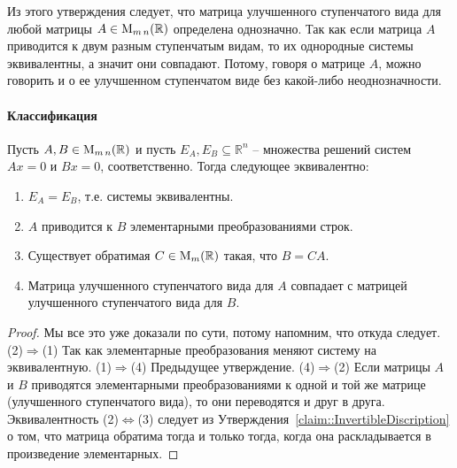 Из этого утверждения следует, что матрица улучшенного ступенчатого вида для любой матрицы $A\in\operatorname{M}_{m\,n}(\mathbb R)$ определена однозначно.
Так как если матрица $A$ приводится к двум разным ступенчатым видам, то их однородные системы эквивалентны, а значит они совпадают.
Потому, говоря о матрице $A$, можно говорить и о ее улучшенном ступенчатом виде без какой-либо неоднозначности.

\paragraph{Классификация}

\begin{claim}
Пусть $A,B\in\operatorname{M}_{m\,n}(\mathbb R)$ и пусть $E_A, E_B\subseteq \mathbb R^n$ -- множества решений систем $Ax = 0$ и $Bx = 0$, соответственно.
Тогда следующее эквивалентно:
\begin{enumerate}
\item $E_A = E_B$, т.е. системы эквивалентны.

\item $A$ приводится к $B$ элементарными преобразованиями строк.

\item Существует обратимая $C\in\operatorname{M}_{m}(\mathbb R)$ такая, что $B = CA$.

\item Матрица улучшенного ступенчатого вида для $A$ совпадает с матрицей улучшенного ступенчатого вида для $B$.
\end{enumerate}
\end{claim}
\begin{proof}
Мы все это уже доказали по сути, потому напомним, что откуда следует.
(2)$\Rightarrow$(1) Так как элементарные преобразования меняют систему на эквивалентную.
(1)$\Rightarrow$(4)  Предыдущее утверждение.
(4)$\Rightarrow$(2) Если матрицы $A$ и $B$ приводятся элементарными преобразованиями к одной и той же матрице (улучшенного ступенчатого вида), то они переводятся и друг в друга.
Эквивалентность (2)$\Leftrightarrow$(3) следует из Утверждения~\ref{claim::InvertibleDiscription} о том, что матрица обратима тогда и только тогда, когда она раскладывается в произведение элементарных.
\end{proof}

